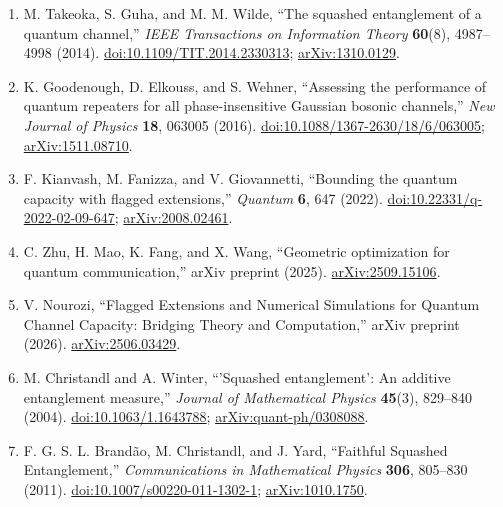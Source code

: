 \begin{enumerate}[label={},leftmargin=4.8em,labelsep=0.5em]
  \footnotesize
  \item[\textup{[TGW14]}]\label{ref:sd-takeoka-guha-wilde}
  M. Takeoka, S. Guha, and M. M. Wilde, ``The squashed entanglement of a
  quantum channel,'' \emph{IEEE Transactions on Information Theory}
  \textbf{60}(8), 4987--4998 (2014).
  \href{https://doi.org/10.1109/TIT.2014.2330313}{doi:10.1109/TIT.2014.2330313};
  \href{https://arxiv.org/abs/1310.0129}{arXiv:1310.0129}.

  \item[\textup{[GEW16]}]\label{ref:sd-goodenough-elkouss-wehner}
  K. Goodenough, D. Elkouss, and S. Wehner, ``Assessing the performance of
  quantum repeaters for all phase-insensitive Gaussian bosonic
  channels,'' \emph{New Journal of Physics} \textbf{18}, 063005 (2016).
  \href{https://doi.org/10.1088/1367-2630/18/6/063005}{doi:10.1088/1367-2630/18/6/063005};
  \href{https://arxiv.org/abs/1511.08710}{arXiv:1511.08710}.

  \item[\textup{[KFG22]}]\label{ref:sd-kianvash-fanizza-giovannetti}
  F. Kianvash, M. Fanizza, and V. Giovannetti, ``Bounding the quantum
  capacity with flagged extensions,'' \emph{Quantum} \textbf{6}, 647
  (2022).
  \href{https://doi.org/10.22331/q-2022-02-09-647}{doi:10.22331/q-2022-02-09-647};
  \href{https://arxiv.org/abs/2008.02461}{arXiv:2008.02461}.

  \item[\textup{[ZMFW25]}]\label{ref:sd-zhu-mao-fang-wang}
  C. Zhu, H. Mao, K. Fang, and X. Wang, ``Geometric optimization for
  quantum communication,'' arXiv preprint (2025).
  \href{https://arxiv.org/abs/2509.15106}{arXiv:2509.15106}.

  \item[\textup{[Nour26]}]\label{ref:sd-nourozi}
  V. Nourozi, ``Flagged Extensions and Numerical Simulations for Quantum
  Channel Capacity: Bridging Theory and Computation,'' arXiv preprint
  (2026).
  \href{https://arxiv.org/abs/2506.03429}{arXiv:2506.03429}.

  \item[\textup{[CW04]}]\label{ref:sd-christandl-winter}
  M. Christandl and A. Winter, ``'Squashed entanglement': An additive
  entanglement measure,'' \emph{Journal of Mathematical Physics}
  \textbf{45}(3), 829--840 (2004).
  \href{https://doi.org/10.1063/1.1643788}{doi:10.1063/1.1643788};
  \href{https://arxiv.org/abs/quant-ph/0308088}{arXiv:quant-ph/0308088}.

  \item[\textup{[BCY11]}]\label{ref:sd-brandao-christandl-yard}
  F. G. S. L. Brand\~ao, M. Christandl, and J. Yard, ``Faithful Squashed
  Entanglement,'' \emph{Communications in Mathematical Physics} \textbf{306},
  805--830 (2011).
  \href{https://doi.org/10.1007/s00220-011-1302-1}{doi:10.1007/s00220-011-1302-1};
  \href{https://arxiv.org/abs/1010.1750}{arXiv:1010.1750}.
\end{enumerate}

